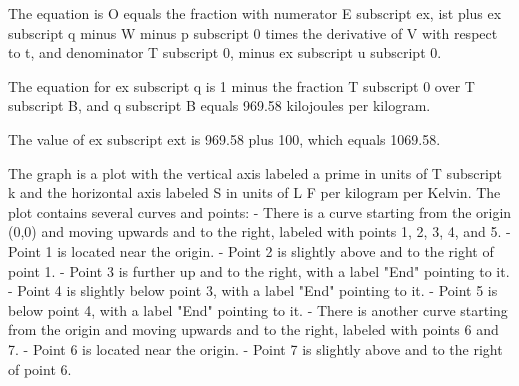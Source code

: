 The equation is O equals the fraction with numerator E subscript ex, ist plus ex subscript q minus W minus p subscript 0 times the derivative of V with respect to t, and denominator T subscript 0, minus ex subscript u subscript 0.

The equation for ex subscript q is 1 minus the fraction T subscript 0 over T subscript B, and q subscript B equals 969.58 kilojoules per kilogram.

The value of ex subscript ext is 969.58 plus 100, which equals 1069.58.

The graph is a plot with the vertical axis labeled a prime in units of T subscript k and the horizontal axis labeled S in units of L F per kilogram per Kelvin. The plot contains several curves and points:
- There is a curve starting from the origin (0,0) and moving upwards and to the right, labeled with points 1, 2, 3, 4, and 5.
- Point 1 is located near the origin.
- Point 2 is slightly above and to the right of point 1.
- Point 3 is further up and to the right, with a label "End" pointing to it.
- Point 4 is slightly below point 3, with a label "End" pointing to it.
- Point 5 is below point 4, with a label "End" pointing to it.
- There is another curve starting from the origin and moving upwards and to the right, labeled with points 6 and 7.
- Point 6 is located near the origin.
- Point 7 is slightly above and to the right of point 6.